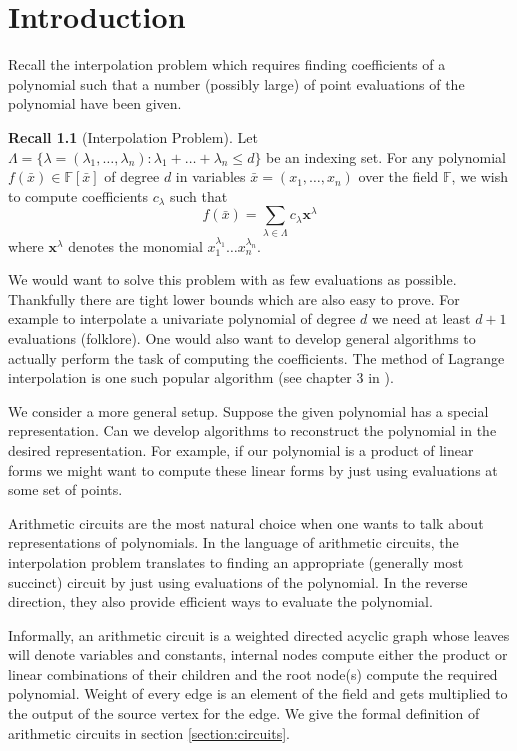 \documentclass[12pt]{caltech_thesis}
\theoremstyle{plain}
\theoremstyle{definition}
\newtheorem{recall}{Recall}
\newcommand{\F}{\mathbb{F}}
\newcommand{\B}[1]{\bar{#1}}
\begin{document}
\tableofcontents


\mainmatter

\chapter{Introduction}\label{chapter:introduction}

Recall the interpolation problem which requires finding coefficients of a polynomial such that 
a number (possibly large) of point evaluations of the polynomial have been given.
\begin{recall}[Interpolation Problem]

Let $\Lambda = \{\lambda = (\lambda_1,\ldots,\lambda_n) : \lambda_1+\ldots+\lambda_n \leq d\}$ be an 
indexing set. For any polynomial $f(\B{x}) \in \F[\B{x}]$ of degree $d$ in variables $\B{x} = (x_1,\ldots,x_n)$ over the field $\F$,
 we wish to compute coefficients $c_{\lambda}$ such that 
 \[
  f(\B{x}) = \sum\limits_{\lambda\in \Lambda}c_{\lambda}\mathbf{x}^\lambda
 \]
where $\mathbf{x}^{\lambda}$ denotes the monomial $x_1^{\lambda_1}\ldots x_n^{\lambda_n}$.
\end{recall}

We would want to solve this problem with as few evaluations as possible. Thankfully there are tight lower bounds
which are also easy to prove. For example to interpolate a univariate polynomial of degree $d$ we need at least $d+1$
evaluations (folklore). One would also want to develop general algorithms to actually perform the task of computing the coefficients.
The method of Lagrange interpolation is one such popular algorithm (see chapter $3$ in \cite{Hildebrand87}).

We consider a more general setup. Suppose the given polynomial has a special representation. Can we develop algorithms 
to reconstruct the polynomial in the desired representation. For example, if our polynomial is a product of linear forms
we might want to compute these linear forms by just using evaluations at some set of points.

Arithmetic circuits are the most natural choice when one wants to talk about representations of polynomials. 
In the language of arithmetic circuits, the interpolation problem translates to finding an appropriate (generally most succinct) circuit 
by just using evaluations of the polynomial. In the reverse direction, they also provide efficient ways to evaluate the polynomial. 

Informally, an arithmetic circuit is a weighted directed acyclic graph whose leaves will denote variables and constants, 
internal nodes compute either the product or linear combinations of their children and the root node(s) compute the required polynomial.
Weight of every edge is an element of the field and gets multiplied to the output of the source vertex for the edge.
We give the formal definition of arithmetic circuits in section \ref{section:circuits}. 
\end{document}

